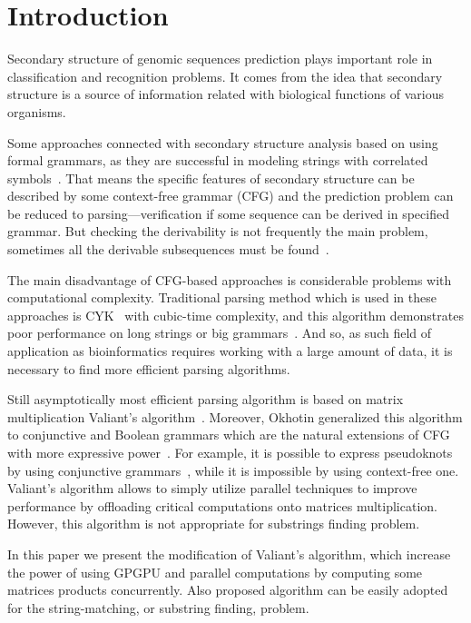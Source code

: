 \section{\bf Introduction}

Secondary structure of genomic sequences prediction plays important role in classification and recognition problems. It comes from the idea that secondary structure is a source of information  related with biological functions of various organisms.

Some approaches connected with secondary structure analysis based on using formal grammars, as they are successful in modeling strings with correlated symbols~\cite{knudsen1999rna, dowell2004evaluation}.
That means the specific features of secondary structure can be described by some context-free grammar (CFG) and the prediction problem can be reduced to parsing---verification if some sequence can be derived in specified grammar.
But checking the derivability is not frequently the main problem, sometimes all the derivable subsequences must be found~\cite{durbin1996biological}.

The main disadvantage of CFG-based approaches is considerable problems with computational complexity.
Traditional parsing method which is used in these approaches is CYK~\cite{kasami1966efficient, Younger:1966:CLP:1441427.1442019} with cubic-time complexity, and this algorithm demonstrates poor performance on long strings or big grammars~\cite{liu2005parallel}.
And so, as such field of application as bioinformatics requires working with a large amount of data, it is necessary to find more efficient parsing algorithms.

Still asymptotically most efficient parsing algorithm is based on matrix multiplication Valiant's algorithm~\cite{Valiant:1975:GCR:1739932.1740048}.
Moreover, Okhotin generalized this algorithm to conjunctive and Boolean grammars which are the natural extensions of CFG with more expressive power~\cite{Okhotin:2014:PMM:2565359.2565379}.
For example, it is possible to express pseudoknots by using conjunctive grammars~\cite{zier2013rna}, while it is impossible by using context-free one.
Valiant’s algorithm allows to simply utilize parallel techniques to improve performance by offloading critical computations onto matrices multiplication.
However, this algorithm is not appropriate for substrings finding problem.

In this paper we present the modification of Valiant's algorithm, which increase the power of using GPGPU and parallel computations by computing some matrices products concurrently.
Also proposed algorithm can be easily adopted for the string-matching, or substring finding, problem.
